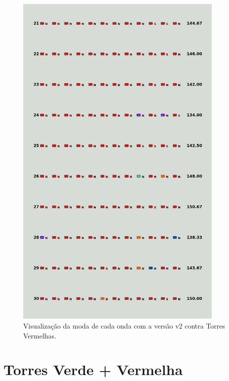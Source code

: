 \begin{figure}[H]
  \centering
  \includegraphics[width=0.9\textwidth]{figuras/td/td_allred_ai_mode_2_3.png}
  \caption{Visualização da moda de cada onda com a versão v2 contra Torres Vermelhas.}
  \label{fig:td-moda-red-2-3}
\end{figure}

\section{Torres Verde + Vermelha}
\label{sec:apend-moda-td-gr-v2}

